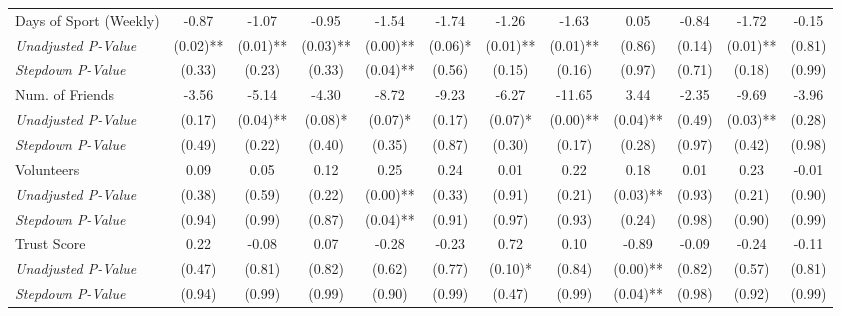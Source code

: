 \begin{tabular}{l c c c c c c c c c c c}
Days of Sport (Weekly) & -0.87 & -1.07 & -0.95 & -1.54 & -1.74 & -1.26 & -1.63 & 0.05 & -0.84 & -1.72 & -0.15 \\
\quad \textit{Unadjusted P-Value} & (0.02)** & (0.01)** & (0.03)** & (0.00)** & (0.06)* & (0.01)** & (0.01)** & (0.86) & (0.14) & (0.01)** & (0.81) \\
\quad \textit{Stepdown P-Value} & (0.33) & (0.23) & (0.33) & (0.04)** & (0.56) & (0.15) & (0.16) & (0.97) & (0.71) & (0.18) & (0.99) \\
Num. of Friends & -3.56 & -5.14 & -4.30 & -8.72 & -9.23 & -6.27 & -11.65 & 3.44 & -2.35 & -9.69 & -3.96 \\
\quad \textit{Unadjusted P-Value} & (0.17) & (0.04)** & (0.08)* & (0.07)* & (0.17) & (0.07)* & (0.00)** & (0.04)** & (0.49) & (0.03)** & (0.28) \\
\quad \textit{Stepdown P-Value} & (0.49) & (0.22) & (0.40) & (0.35) & (0.87) & (0.30) & (0.17) & (0.28) & (0.97) & (0.42) & (0.98) \\
Volunteers & 0.09 & 0.05 & 0.12 & 0.25 & 0.24 & 0.01 & 0.22 & 0.18 & 0.01 & 0.23 & -0.01 \\
\quad \textit{Unadjusted P-Value} & (0.38) & (0.59) & (0.22) & (0.00)** & (0.33) & (0.91) & (0.21) & (0.03)** & (0.93) & (0.21) & (0.90) \\
\quad \textit{Stepdown P-Value} & (0.94) & (0.99) & (0.87) & (0.04)** & (0.91) & (0.97) & (0.93) & (0.24) & (0.98) & (0.90) & (0.99) \\
Trust Score & 0.22 & -0.08 & 0.07 & -0.28 & -0.23 & 0.72 & 0.10 & -0.89 & -0.09 & -0.24 & -0.11 \\
\quad \textit{Unadjusted P-Value} & (0.47) & (0.81) & (0.82) & (0.62) & (0.77) & (0.10)* & (0.84) & (0.00)** & (0.82) & (0.57) & (0.81) \\
\quad \textit{Stepdown P-Value} & (0.94) & (0.99) & (0.99) & (0.90) & (0.99) & (0.47) & (0.99) & (0.04)** & (0.98) & (0.92) & (0.99) \\
\bottomrule
\end{tabular}
